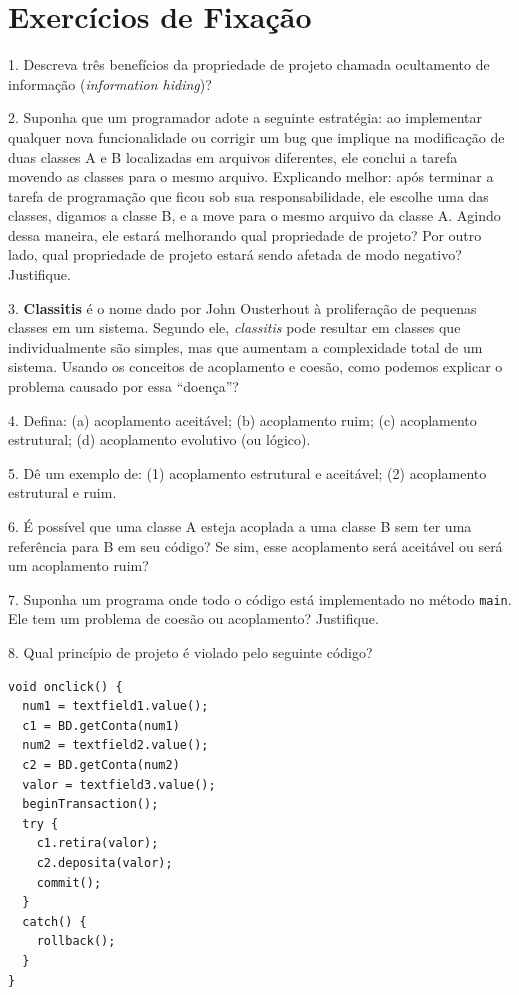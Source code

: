 \documentclass[
  11pt,
  twoside]{book}
\newcommand{\passthrough}[1]{#1}
\begin{document}
\hypertarget{exercuxedcios-de-fixauxe7uxe3o-4}{%
\section*{Exercícios de
Fixação}\label{exercuxedcios-de-fixauxe7uxe3o-4}}

1. Descreva três benefícios da propriedade de projeto chamada
ocultamento de informação (\emph{information hiding})?

2. Suponha que um programador adote a seguinte estratégia: ao
implementar qualquer nova funcionalidade ou corrigir um bug que implique
na modificação de duas classes A e B localizadas em arquivos diferentes,
ele conclui a tarefa movendo as classes para o mesmo arquivo. Explicando
melhor: após terminar a tarefa de programação que ficou sob sua
responsabilidade, ele escolhe uma das classes, digamos a classe B, e a
move para o mesmo arquivo da classe A. Agindo dessa maneira, ele estará
melhorando qual propriedade de projeto? Por outro lado, qual propriedade
de projeto estará sendo afetada de modo negativo? Justifique.

3. \textbf{Classitis} é o nome dado por John Ousterhout
 à proliferação de pequenas classes em um
sistema. Segundo ele, \emph{classitis} pode resultar em classes que
individualmente são simples, mas que aumentam a complexidade total de um
sistema. Usando os conceitos de acoplamento e coesão, como podemos
explicar o problema causado por essa ``doença''?

4. Defina: (a) acoplamento aceitável; (b) acoplamento ruim; (c)
acoplamento estrutural; (d) acoplamento evolutivo (ou lógico).

5. Dê um exemplo de: (1) acoplamento estrutural e aceitável; (2)
acoplamento estrutural e ruim.

6. É possível que uma classe A esteja acoplada a uma classe B sem ter
uma referência para B em seu código? Se sim, esse acoplamento será
aceitável ou será um acoplamento ruim?

7. Suponha um programa onde todo o código está implementado no método
\passthrough{\lstinline!main!}. Ele tem um problema de coesão ou
acoplamento? Justifique.

8. Qual princípio de projeto é violado pelo seguinte código?

\begin{lstlisting}
void onclick() {
  num1 = textfield1.value();
  c1 = BD.getConta(num1)
  num2 = textfield2.value();
  c2 = BD.getConta(num2)
  valor = textfield3.value();
  beginTransaction();
  try {
    c1.retira(valor);
    c2.deposita(valor);
    commit();
  }          
  catch() {
    rollback();
  }
}  
\end{lstlisting}
\end{document}
